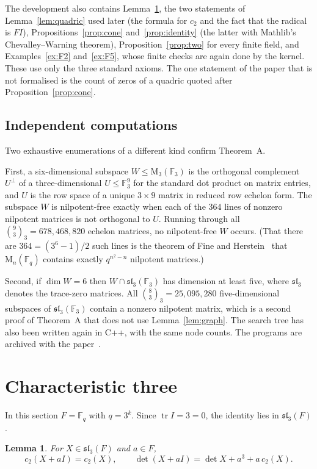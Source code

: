 \documentclass[11pt]{amsart}
\newtheorem{lemma}[theorem]{Lemma}
\theoremstyle{definition}
\theoremstyle{remark}
\numberwithin{equation}{section}
\newcommand{\F}{\mathbb{F}}
\newcommand{\M}{\mathrm{M}}
\newcommand{\sll}{\mathfrak{sl}}
\newcommand{\tr}{\operatorname{tr}}
\begin{document}
The development also contains Lemma~\ref{lem:shift}, the two statements of Lemma~\ref{lem:quadric} used later (the formula for $c_2$ and the fact that the radical is $FI$), Propositions~\ref{prop:cone} and~\ref{prop:identity} (the latter with Mathlib's Chevalley--Warning theorem), Proposition~\ref{prop:two} for every finite field, and Examples~\ref{ex:F2} and~\ref{ex:F5}, whose finite checks are again done by the kernel. These use only the three standard axioms. The one statement of the paper that is not formalised is the count of zeros of a quadric quoted after Proposition~\ref{prop:cone}.

\subsection{Independent computations}
Two exhaustive enumerations of a different kind confirm Theorem~A.

First, a six-dimensional subspace $W\le\M_3(\F_3)$ is the orthogonal complement $U^\perp$ of a three-dimensional $U\le\F_3^9$ for the standard dot product on matrix entries, and $U$ is the row space of a unique $3\times9$ matrix in reduced row echelon form. The subspace $W$ is nilpotent-free exactly when each of the $364$ lines of nonzero nilpotent matrices is not orthogonal to $U$. Running through all $\binom{9}{3}_3=678{,}468{,}820$ echelon matrices, no nilpotent-free $W$ occurs. (That there are $364=(3^6-1)/2$ such lines is the theorem of Fine and Herstein~\cite{FH} that $\M_n(\F_q)$ contains exactly $q^{n^2-n}$ nilpotent matrices.)

Second, if $\dim W=6$ then $W\cap\sll_3(\F_3)$ has dimension at least five, where $\sll_3$ denotes the trace-zero matrices. All $\binom 83_3=25{,}095{,}280$ five-dimensional subspaces of $\sll_3(\F_3)$ contain a nonzero nilpotent matrix, which is a second proof of Theorem~A that does not use Lemma~\ref{lem:graph}. The search tree has also been written again in C++, with the same node counts. The programs are archived with the paper~\cite{Ar}.

\section{Characteristic three}\label{sec:char3}

In this section $F=\F_q$ with $q=3^k$. Since $\tr I=3=0$, the identity lies in $\sll_3(F)$.

\begin{lemma}\label{lem:shift}
For $X\in\sll_3(F)$ and $a\in F$,
\[
c_2(X+aI)=c_2(X),\qquad \det(X+aI)=\det X+a^3+a\,c_2(X).
\]
\end{lemma}
\end{document}
